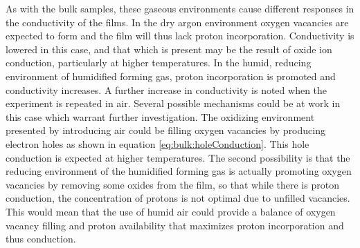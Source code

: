 As with the bulk samples, these gaseous environments cause different responses in the conductivity of the films. In the dry argon environment oxygen vacancies are expected to form and the film will thus lack proton incorporation. Conductivity is lowered in this case, and that which is present may be the result of oxide ion conduction, particularly at higher temperatures. In the humid, reducing environment of humidified forming gas, proton incorporation is promoted and conductivity increases. A further increase in conductivity is noted when the experiment is repeated in air. Several possible mechanisms could be at work in this case which warrant further investigation. The oxidizing environment presented by introducing air could be filling oxygen vacancies by producing electron holes as shown in equation \ref{eq:bulk:holeConduction}. This hole conduction is expected at higher temperatures. The second possibility is that the reducing environment of the humidified forming gas is actually promoting oxygen vacancies by removing some oxides from the film, so that while there is proton conduction, the concentration of protons is not optimal due to unfilled vacancies. This would mean that the use of humid air could provide a balance of oxygen vacancy filling and proton availability that maximizes proton incorporation and thus conduction. 

\vspace{12pt}
